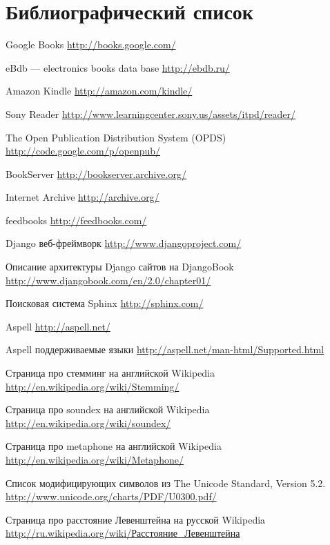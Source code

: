 \cleardoublepage
\section{Библиографический список}
 
\renewcommand*{\refname}{}
\begin{thebibliography}{99}

 Google Books \url{http://books.google.com/}

 eBdb --- electronics books data base \url{http://ebdb.ru/}

 Amazon Kindle \url{http://amazon.com/kindle/}

 Sony Reader \url{http://www.learningcenter.sony.us/assets/itpd/reader/}

 The Open Publication Distribution System (OPDS) \url{http://code.google.com/p/openpub/}

 BookServer \url{http://bookserver.archive.org/}

 Internet Archive \url{http://archive.org/}

 feedbooks \url{http://feedbooks.com/}

 Django веб-фреймворк \url{http://www.djangoproject.com/}

 Описание архитектуры Django сайтов на DjangoBook \url{http://www.djangobook.com/en/2.0/chapter01/}

 Поисковая система Sphinx \url{http://sphinx.com/}

 Aspell \url{http://aspell.net/}

 Aspell поддерживаемые языки \url{http://aspell.net/man-html/Supported.html}

 Страница про стемминг на английской Wikipedia \url{http://en.wikipedia.org/wiki/Stemming/}

 Страница про soundex на английской Wikipedia \url{http://en.wikipedia.org/wiki/soundex/}

 Страница про metaphone на английской Wikipedia \url{http://en.wikipedia.org/wiki/Metaphone/}

 Список модифицирующих символов из The Unicode Standard, Version 5.2.  \url{http://www.unicode.org/charts/PDF/U0300.pdf/}

 Страница про расстояние Левенштейна на русской Wikipedia \url{http://ru.wikipedia.org/wiki/Расстояние_Левенштейна}


\end{thebibliography}